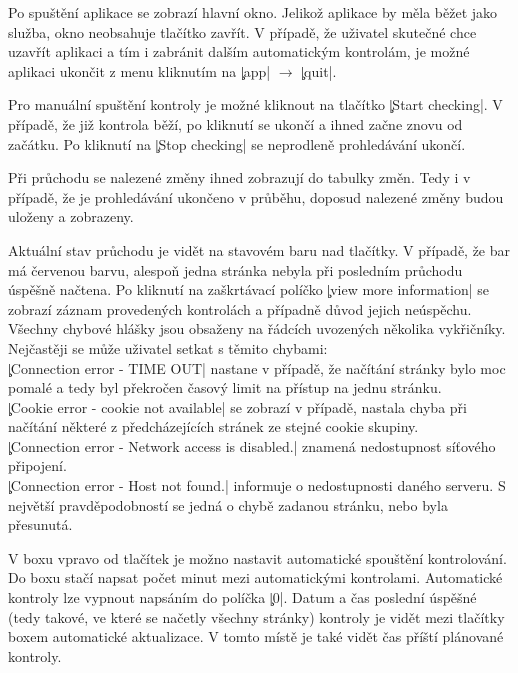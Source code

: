 Po spuštění aplikace se zobrazí hlavní okno.
Jelikož aplikace by měla běžet jako služba, okno neobsahuje tlačítko zavřít.
V případě, že uživatel skutečné chce uzavřít aplikaci a tím i zabránit dalším automatickým kontrolám, je možné aplikaci ukončit z menu kliknutím na \c|app| $\rightarrow$ \c|quit|.

Pro manuální spuštění kontroly je možné kliknout na tlačítko \c|Start checking|.
V případě, že již kontrola běží, po kliknutí se ukončí a ihned začne znovu od začátku.
Po kliknutí na \c|Stop checking| se neprodleně prohledávání ukončí.

Při průchodu se nalezené změny ihned zobrazují do tabulky změn.
Tedy i v případě, že je prohledávání ukončeno v průběhu, doposud nalezené změny budou uloženy a zobrazeny.

Aktuální stav průchodu je vidět na stavovém baru  nad tlačítky.
V případě, že bar má červenou barvu, alespoň jedna stránka nebyla při posledním průchodu úspěšně načtena.
Po kliknutí na zaškrtávací políčko \c|view more information| se zobrazí záznam provedených kontrolách a případně důvod jejich neúspěchu.
Všechny chybové hlášky jsou obsaženy na řádcích uvozených několika vykřičníky.
Nejčastěji se může uživatel setkat s těmito chybami:\\
\c|Connection error - TIME OUT| nastane v případě, že načítání stránky bylo moc pomalé a tedy byl překročen časový limit na přístup na jednu stránku.\\ %
\c|Cookie error - cookie not available| se zobrazí v případě, nastala chyba při načítání některé z předcházejících stránek ze stejné cookie skupiny.\\
\c|Connection error - Network access is disabled.| znamená nedostupnost síťového připojení.\\
\c|Connection error - Host not found.| informuje o nedostupnosti daného serveru. S největší pravděpodobností se  jedná o chybě zadanou stránku, nebo byla přesunutá.

V boxu vpravo od tlačítek je možno nastavit automatické spouštění kontrolování.
Do boxu stačí napsat počet minut mezi automatickými kontrolami.
Automatické kontroly lze vypnout napsáním do políčka \c|0|.
Datum a čas poslední úspěšné (tedy takové, ve které se načetly všechny stránky) kontroly je vidět mezi tlačítky boxem automatické aktualizace.
V tomto místě je také vidět čas příští plánované kontroly.

